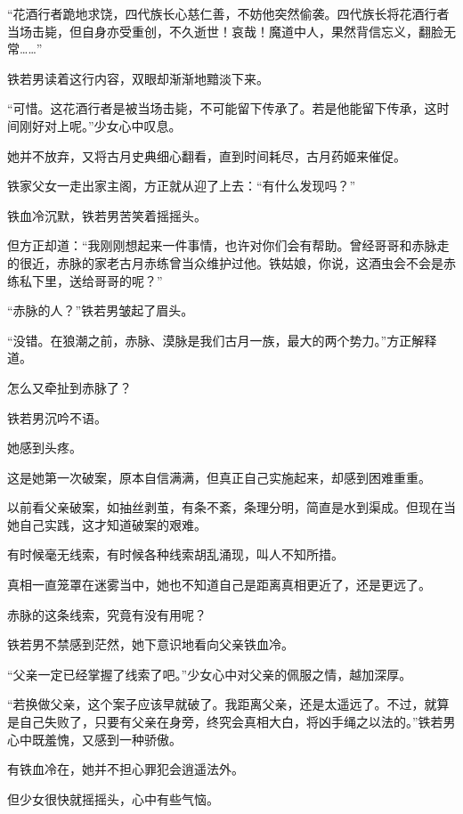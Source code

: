 
\begin{this_body}

“花酒行者跪地求饶，四代族长心慈仁善，不妨他突然偷袭。四代族长将花酒行者当场击毙，但自身亦受重创，不久逝世！哀哉！魔道中人，果然背信忘义，翻脸无常……”

铁若男读着这行内容，双眼却渐渐地黯淡下来。

“可惜。这花酒行者是被当场击毙，不可能留下传承了。若是他能留下传承，这时间刚好对上呢。”少女心中叹息。

她并不放弃，又将古月史典细心翻看，直到时间耗尽，古月药姬来催促。

铁家父女一走出家主阁，方正就从迎了上去：“有什么发现吗？”

铁血冷沉默，铁若男苦笑着摇摇头。

但方正却道：“我刚刚想起来一件事情，也许对你们会有帮助。曾经哥哥和赤脉走的很近，赤脉的家老古月赤练曾当众维护过他。铁姑娘，你说，这酒虫会不会是赤练私下里，送给哥哥的呢？”

“赤脉的人？”铁若男皱起了眉头。

“没错。在狼潮之前，赤脉、漠脉是我们古月一族，最大的两个势力。”方正解释道。

怎么又牵扯到赤脉了？

铁若男沉吟不语。

她感到头疼。

这是她第一次破案，原本自信满满，但真正自己实施起来，却感到困难重重。

以前看父亲破案，如抽丝剥茧，有条不紊，条理分明，简直是水到渠成。但现在当她自己实践，这才知道破案的艰难。

有时候毫无线索，有时候各种线索胡乱涌现，叫人不知所措。

真相一直笼罩在迷雾当中，她也不知道自己是距离真相更近了，还是更远了。

赤脉的这条线索，究竟有没有用呢？

铁若男不禁感到茫然，她下意识地看向父亲铁血冷。

“父亲一定已经掌握了线索了吧。”少女心中对父亲的佩服之情，越加深厚。

“若换做父亲，这个案子应该早就破了。我距离父亲，还是太遥远了。不过，就算是自己失败了，只要有父亲在身旁，终究会真相大白，将凶手绳之以法的。”铁若男心中既羞愧，又感到一种骄傲。

有铁血冷在，她并不担心罪犯会逍遥法外。

但少女很快就摇摇头，心中有些气恼。


\end{this_body}
